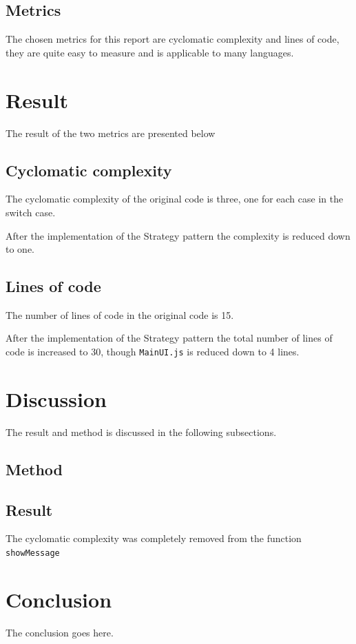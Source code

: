 \documentclass[conference, a4paper]{IEEEtran}
\begin{document}
\subsection{Metrics}
The chosen metrics for this report are cyclomatic complexity and lines of code, they are quite easy to measure and is applicable to many languages.

\section{Result}
The result of the two metrics are presented below

\subsection{Cyclomatic complexity}
The cyclomatic complexity of the original code is three, one for each case in the switch case.

After the implementation of the Strategy pattern the complexity is reduced down to one.

\subsection{Lines of code}
The number of lines of code in the original code is 15.

After the implementation of the Strategy pattern the total number of lines of code is increased to 30, though \texttt{MainUI.js} is reduced down to 4 lines.

\section{Discussion}
The result and method is discussed in the following subsections.

\subsection{Method}


\subsection{Result}
The cyclomatic complexity was completely removed from the function \texttt{showMessage}

\section{Conclusion}
The conclusion goes here.
\end{document}
